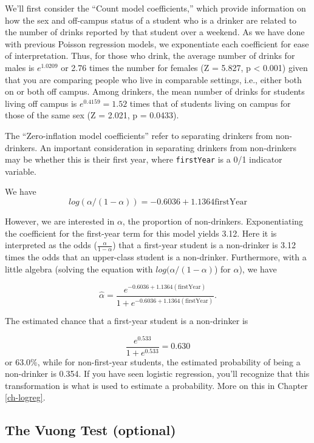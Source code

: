 \documentclass[
]{krantz}
\begin{document}
We'll first consider the ``Count model coefficients,'' which provide information on how the sex and off-campus status of a student who is a drinker are related to the number of drinks reported by that student over a weekend. As we have done with previous Poisson regression models, we exponentiate each coefficient for ease of interpretation. Thus, for those who drink, the average number of drinks for males is \(e^{1.0209}\) or 2.76 times the number for females (Z = 5.827, p \textless{} 0.001) given that you are comparing people who live in comparable settings, i.e., either both on or both off campus. Among drinkers, the mean number of drinks for students living off campus is \(e^{0.4159}=1.52\) times that of students living on campus for those of the same sex (Z = 2.021, p = 0.0433).

The ``Zero-inflation model coefficients'' refer to separating drinkers from non-drinkers. An important consideration in separating drinkers from non-drinkers may be whether this is their first year, where \texttt{firstYear} is a 0/1 indicator variable.

We have
\[ 
log(\alpha/(1-\alpha)) =-0.6036+1.1364\textrm{firstYear}
 \]

However, we are interested in \(\alpha\), the proportion of non-drinkers. Exponentiating the coefficient for the first-year term for this model yields 3.12. Here it is interpreted as the odds (\(\frac{\alpha}{1-\alpha}\)) that a first-year student is a non-drinker is 3.12 times the odds that an upper-class student is a non-drinker. Furthermore, with a little algebra (solving the equation with \(log(\alpha/(1-\alpha)\)) for \(\alpha\)),
we have

\[
 \hat{\alpha} =
 \frac{e^ {-0.6036+1.1364(\textrm{firstYear})}}
 {1+e^{
 -0.6036+1.1364(\textrm{firstYear})
 }
 }.
 \]

The estimated chance that a first-year student is a non-drinker is

\[
\frac{e^{0.533}}{1+e^{0.533}} = 0.630
\]
or 63.0\%, while for non-first-year students, the estimated probability of being a non-drinker is 0.354. If you have seen logistic regression, you'll recognize that this transformation is what is used to estimate a probability. More on this in Chapter \ref{ch-logreg}.

\hypertarget{the-vuong-test-optional}{%
\subsection{The Vuong Test (optional)}\label{the-vuong-test-optional}}
\end{document}
